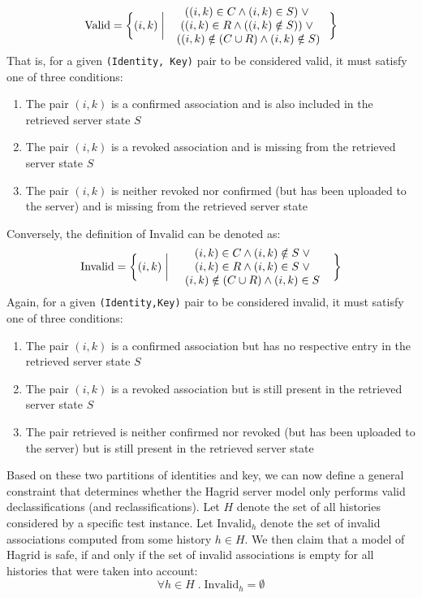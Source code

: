 \begin{equation}
    \text{Valid} = \biggl \{ (i,k) \;\bigg|\; \pctext{1.97in}{
        \( ((i,k) \in C \wedge (i,k) \in S)\; \vee \; \)
        \( ((i,k) \in R \wedge ((i,k) \notin S) )\; \vee \; \)
        \( ((i,k) \notin (C \cup R) \wedge (i,k) \notin S) \) }  
    \biggr \}
\end{equation}
That is, for a given \texttt{(Identity, Key)} pair to be considered valid, it must satisfy one of three conditions: 
\begin{enumerate}
    \item The pair \((i,k)\) is a confirmed association and is also included in the retrieved server state \(S\)
    \item The pair \((i,k)\) is a revoked association and is missing from the retrieved server state \(S\)
    \item The pair \((i,k)\) is neither revoked nor confirmed (but has been uploaded to the server) and is missing from the retrieved server state
\end{enumerate}
Conversely, the definition of \(\text{Invalid}\) can be denoted as: 
\begin{equation}
    \text{Invalid} = \biggl \{
        (i,k) \;\bigg|\; \pctext{1.97in}{
            \((i,k) \in C \wedge (i,k) \notin S \; \vee \)
            \((i,k) \in R \wedge (i,k) \in S \; \vee \)
            \((i,k) \notin (C \cup R) \wedge (i,k) \in S\)
        }
    \biggr \}
\end{equation}
Again, for a given \texttt{(Identity,Key)} pair to be considered invalid, it must satisfy one of three conditions:

\begin{enumerate}
    \item The pair \((i,k)\) is a confirmed association but has no respective entry in the retrieved server state \(S\)
    \item The pair \((i,k)\) is a revoked association but is still present in the retrieved server state \(S\)
    \item The pair retrieved is neither confirmed nor revoked (but has been uploaded to the server) but is still present in the retrieved server state
\end{enumerate}

Based on these two partitions of identities and key, we can now define a general constraint that determines whether the Hagrid server model only performs valid declassifications (and reclassifications). 
Let \(H\) denote the set of all histories considered by a specific test instance. Let \(\text{Invalid}_h\) denote the set of invalid associations computed from some history \(h \in H\). We then claim that a model of Hagrid is safe, if and only if the set of invalid associations is empty for all histories that were taken into account:
\[
    \forall h \in H \; .\; \text{Invalid}_h = \emptyset
\]


